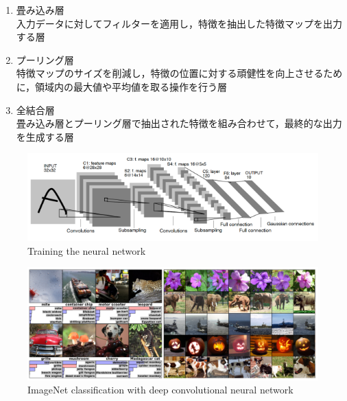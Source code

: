   \begin{enumerate}
    \item 畳み込み層\\
    入力データに対してフィルターを適用し，特徴を抽出した特徴マップを出力する層
    \item プーリング層\\
    特徴マップのサイズを削減し，特徴の位置に対する頑健性を向上させるために，領域内の最大値や平均値を取る操作を行う層
    \item 全結合層\\
    畳み込み層とプーリング層で抽出された特徴を組み合わせて，最終的な出力を生成する層
  \end{enumerate}

  \begin{figure}[h]
    \centering
    \includegraphics[keepaspectratio, scale=0.50] {images/yann_CNN.png}
    \caption{Training the neural network \cite{yann1}}
    \label{Fig:yann_CNN}
  \end{figure}

\newpage

  \begin{figure}[h]
    \centering
    \includegraphics[keepaspectratio, scale=0.30] {images/deep_convolutional_neural_networks.png}
    \caption{ImageNet classification with deep convolutional neural network \cite{alex}}
    \label{Fig:deep_convolutional_neural_networks}
  \end{figure}


\newpage

